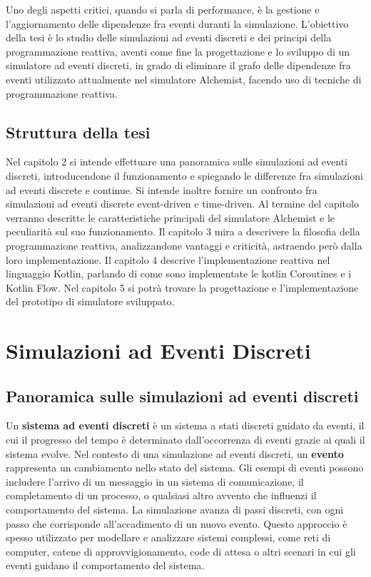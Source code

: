 \documentclass[12pt,a4paper,openright,twoside]{book}
\begin{document}
Uno degli aspetti critici, quando si parla di performance, è la gestione e l'aggiornamento delle dipendenze fra eventi duranti la simulazione. 
L'obiettivo della tesi è lo studio delle simulazioni ad eventi discreti e dei principi della programmazione reattiva, aventi come fine la progettazione e lo sviluppo di un simulatore ad eventi discreti, in grado di eliminare il grafo delle dipendenze fra eventi utilizzato attualmente nel simulatore Alchemist, facendo uso di tecniche di programmazione reattiva. 

\section{Struttura della tesi}
Nel capitolo 2 si intende effettuare una panoramica sulle simulazioni ad eventi discreti, introducendone il funzionamento e spiegando le differenze fra simulazioni ad eventi discrete e continue. Si intende inoltre fornire un confronto fra simulazioni ad eventi discrete event-driven e time-driven. Al termine del capitolo verranno descritte le caratteristiche principali del simulatore Alchemist e le peculiarità sul suo funzionamento. 
Il capitolo 3 mira a descrivere la filosofia della programmazione reattiva, analizzandone vantaggi e criticità, astraendo però dalla loro implementazione. 
Il capitolo 4 descrive l'implementazione reattiva nel linguaggio Kotlin, parlando di come sono implementate le kotlin Coroutines e i Kotlin Flow. 
Nel capitolo 5 si potrà trovare la progettazione e l'implementazione del prototipo di simulatore sviluppato. 


\chapter{Simulazioni ad Eventi Discreti}
\section{Panoramica sulle simulazioni ad eventi discreti}
\label{sec:panoramica-des}
Un \textbf{sistema ad eventi discreti} è un sistema a stati discreti guidato da eventi, il cui il progresso del tempo è determinato dall'occorrenza di eventi grazie ai quali il sistema evolve. Nel contesto di una simulazione ad eventi discreti, un \textbf{evento} rappresenta un cambiamento nello stato del sistema. 
Gli esempi di eventi possono includere l'arrivo di un messaggio in un sistema di comunicazione, il completamento di un processo, o qualsiasi altro avvento che influenzi il comportamento del sistema. La simulazione avanza di passi discreti, con ogni passo che corrisponde all'accadimento di un nuovo evento. 
Questo approccio è spesso utilizzato per modellare e analizzare sistemi complessi, come reti di computer, catene di approvvigionamento, code di attesa o altri scenari in cui gli eventi guidano il comportamento del sistema. 
\end{document}
